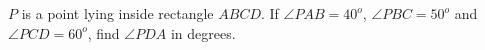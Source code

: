 $P$ is a point lying inside rectangle $ABCD$. If $\angle PAB = 40^o$, $\angle PBC = 50^o$ and $\angle PCD = 60^o$, find $\angle PDA$ in degrees.
